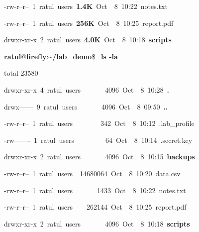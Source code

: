 \documentclass[10pt,a4paper]{article}
\makeatletter
\newcommand{\termprompt}[1][\textasciitilde]{%
  \textbf{\textcolor{termuser}{ratul}}\textcolor{termtext}{@}\textbf{\textcolor{termhost}{firefly}}\textcolor{termtext}{:}\textbf{\textcolor{termpath}{#1}}\textcolor{termcmd}{\$}\ %
}
\makeatother
\begin{document}
{\textcolor{termperm}{-rw-r--r--}\ 1\ \textcolor{termuser}{ratul}\ \textcolor{termhost}{users}\ \textcolor{termsize}{\textbf{1.4K}}\ Oct\ \ 8\ 10:22\ \textcolor{termfile}{notes.txt}

\textcolor{termperm}{-rw-r--r--}\ 1\ \textcolor{termuser}{ratul}\ \textcolor{termhost}{users}\ \textcolor{termsize}{\textbf{256K}}\ Oct\ \ 8\ 10:25\ \textcolor{termfile}{report.pdf}

\textcolor{termperm}{drwxr-xr-x}\ 2\ \textcolor{termuser}{ratul}\ \textcolor{termhost}{users}\ \textcolor{termsize}{\textbf{4.0K}}\ Oct\ \ 8\ 10:18\ \textcolor{termdir}{\textbf{scripts}}

\vspace{0.14cm}
\termprompt[\textasciitilde/lab\_demo]\textbf{\textcolor{termcmd}{ls -la}}

\textcolor{termout}{total 23580}

\textcolor{termperm}{drwxr-xr-x}\ 4\ \textcolor{termuser}{ratul}\ \textcolor{termhost}{users}\ \ \ \ \ \ \ 4096\ Oct\ \ 8\ 10:28\ \textcolor{termhidden}{\textbf{.}}

\textcolor{termperm}{drwx------}\ 9\ \textcolor{termuser}{ratul}\ \textcolor{termhost}{users}\ \ \ \ \ \ \ 4096\ Oct\ \ 8\ 09:50\ \textcolor{termhidden}{\textbf{..}}

\textcolor{termperm}{-rw-r--r--}\ 1\ \textcolor{termuser}{ratul}\ \textcolor{termhost}{users}\ \ \ \ \ \ \ \ 342\ Oct\ \ 8\ 10:12\ \textcolor{termhidden}{.lab\_profile}

\textcolor{termperm}{-rw-------}\ 1\ \textcolor{termuser}{ratul}\ \textcolor{termhost}{users}\ \ \ \ \ \ \ \ \ 64\ Oct\ \ 8\ 10:14\ \textcolor{termhidden}{.secret.key}

\textcolor{termperm}{drwxr-xr-x}\ 2\ \textcolor{termuser}{ratul}\ \textcolor{termhost}{users}\ \ \ \ \ \ \ 4096\ Oct\ \ 8\ 10:15\ \textcolor{termdir}{\textbf{backups}}

\textcolor{termperm}{-rw-r--r--}\ 1\ \textcolor{termuser}{ratul}\ \textcolor{termhost}{users}\ \ 14680064\ Oct\ \ 8\ 10:20\ \textcolor{termfile}{data.csv}

\textcolor{termperm}{-rw-r--r--}\ 1\ \textcolor{termuser}{ratul}\ \textcolor{termhost}{users}\ \ \ \ \ \ \ 1433\ Oct\ \ 8\ 10:22\ \textcolor{termfile}{notes.txt}

\textcolor{termperm}{-rw-r--r--}\ 1\ \textcolor{termuser}{ratul}\ \textcolor{termhost}{users}\ \ \ \ 262144\ Oct\ \ 8\ 10:25\ \textcolor{termfile}{report.pdf}

\textcolor{termperm}{drwxr-xr-x}\ 2\ \textcolor{termuser}{ratul}\ \textcolor{termhost}{users}\ \ \ \ \ \ \ 4096\ Oct\ \ 8\ 10:18\ \textcolor{termdir}{\textbf{scripts}}

}
\end{document}
